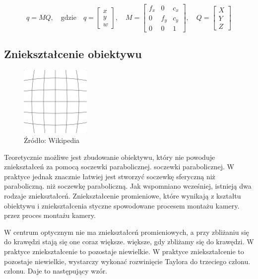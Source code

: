\documentclass[magisterska]{pracadypl}
\begin{document}
\[
q = MQ, \quad \text{gdzie} \quad
q = \begin{bmatrix} x \\ y \\ w \end{bmatrix}, \quad
M = \begin{bmatrix}
f_x & 0 & c_x \\
0 & f_y & c_y \\
0 & 0 & 1
\end{bmatrix}, \quad
Q = \begin{bmatrix} X \\ Y \\ Z \end{bmatrix}
\]

\subsection{Zniekształcenie obiektywu}

\begin{figure}[h]  %
    \centering  %
    \includegraphics[width=0.3\textwidth]{images/barrel.png}  %
    \captionsetup{labelformat=empty, font=footnotesize}
    \caption{Źródło: Wikipedia}
    \label{fig:rpi}  %
\end{figure}

Teoretycznie możliwe jest zbudowanie obiektywu, który nie powoduje zniekształceń za pomocą soczewki parabolicznej.
soczewki parabolicznej. W praktyce jednak znacznie łatwiej jest stworzyć soczewkę sferyczną niż paraboliczną.
niż soczewkę paraboliczną. Jak wspomniano wcześniej, istnieją dwa rodzaje zniekształceń. Zniekształcenie
promieniowe, które wynikają z kształtu obiektywu i zniekształcenia styczne spowodowane procesem montażu kamery.
przez proces montażu kamery.

W centrum optycznym nie ma zniekształceń promieniowych, a przy zbliżaniu się do krawędzi stają się one coraz większe.
większe, gdy zbliżamy się do krawędzi. W praktyce zniekształcenie to pozostaje niewielkie.
W praktyce zniekształcenie to pozostaje niewielkie, wystarczy wykonać rozwinięcie Taylora do trzeciego członu.
członu. Daje to następujący wzór.
\end{document}
